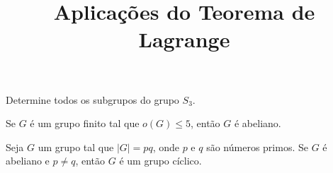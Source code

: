 \documentclass{beamer}
\title{Aplicações do Teorema de Lagrange}
\author[\autor]{\autor}
\institute[\instituto]{\instituto}
\date{}
\begin{document}
    \begin{frame}
        \maketitle
    \end{frame}


    \begin{frame}
        \begin{exemplo}
            Determine todos os subgrupos do grupo $S_3$.
        \end{exemplo}
    \end{frame}

    \begin{frame}
        \begin{proposicao}
            Se $G$ é um grupo finito tal que $o(G) \le 5$, então $G$ é abeliano.
        \end{proposicao}
    \end{frame}

    \begin{frame}
        \begin{proposicao}
            Seja $G$ um grupo tal que $|G| = pq$, onde $p$ e $q$ são números primos. Se $G$ é abeliano e $p \ne q$, então $G$ é um grupo cíclico.
        \end{proposicao}
    \end{frame}
\end{document}
